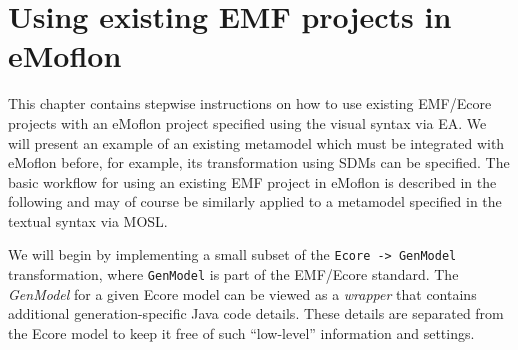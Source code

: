 \newpage

\section{Using existing EMF projects in eMoflon}
\visHeader

This chapter contains stepwise instructions on how to use existing \mbox{EMF}/Ecore projects with an eMoflon project specified using the visual syntax via EA.
We will present an example of an existing metamodel which must be integrated with eMoflon before, for example, its transformation using SDMs can be
specified. The basic workflow for using an existing EMF project in eMoflon is described in the following and may of course be similarly applied to a metamodel
specified in the textual syntax via MOSL. 

We will begin by implementing a small subset of the \texttt{Ecore -> GenModel} transformation, where \texttt{GenModel} is part of the EMF/Ecore standard. The
\emph{GenModel} for a given Ecore model can be viewed as a \emph{wrapper} that contains additional generation-specific Java code details. These details are
separated from the Ecore model to keep it free of such ``low-level'' information and settings.




